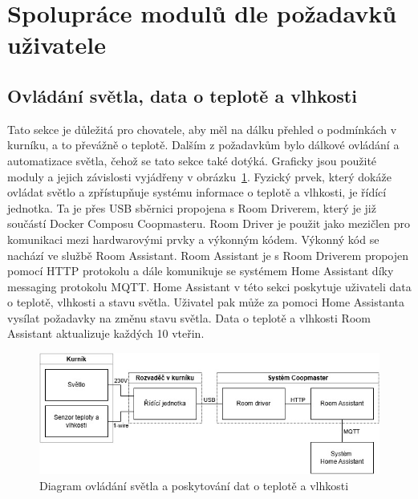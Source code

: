\section{Spolupráce modulů dle požadavků uživatele}\label{sec:schematicka-vyjadreni-zavislosti-jednotlivych-modulu}

\subsection{Ovládání světla, data o teplotě a vlhkosti}
Tato sekce je důležitá pro chovatele, aby měl na dálku přehled o podmínkách v kurníku, a to převážně o teplotě.
Dalším z požadavkům bylo dálkové ovládání a automatizace světla, čehož se tato sekce také dotýká.
Graficky jsou použité moduly a jejich závislosti vyjádřeny v obrázku~\ref{fig:svetlo_teplo_vlhkost}.\newline
Fyzický prvek, který dokáže ovládat světlo a zpřístupňuje systému informace o teplotě a vlhkosti, je řídící jednotka.
Ta je přes USB sběrnici propojena s Room Driverem, který je již součástí Docker Composu Coopmasteru.
Room Driver je použit jako mezičlen pro komunikaci mezi hardwarovými prvky a výkonným kódem.
Výkonný kód se nachází ve službě Room Assistant.
Room Assistant je s Room Driverem propojen pomocí HTTP protokolu a dále komunikuje se systémem Home Assistant díky messaging protokolu MQTT.
Home Assistant v této sekci poskytuje uživateli data o teplotě, vlhkosti a stavu světla.
Uživatel pak může za pomoci Home Assistanta vysílat požadavky na změnu stavu světla.
Data o teplotě a vlhkosti Room Assistant aktualizuje každých 10 vteřin.
\begin{figure}[h]
    \centering
    \includegraphics[width=\textwidth]{img/svetlo_teplo_vlhkost}
    \caption{Diagram ovládání světla a poskytování dat o teplotě a vlhkosti}
    \label{fig:svetlo_teplo_vlhkost}
\end{figure}

